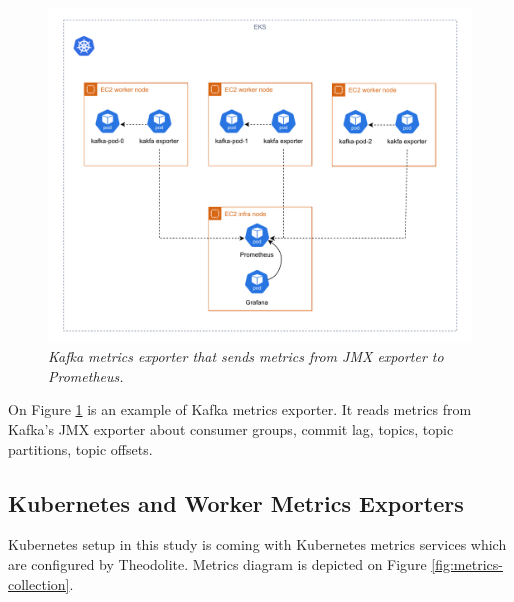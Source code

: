 \begin{figure}[ht]
    \centering
    \includegraphics[width=1\textwidth]{figures/kafka-exporters}
    \caption{\textit{Kafka metrics exporter that sends metrics from JMX exporter to Prometheus.}}
    \label{fig:kafka-exporter}
\end{figure}

On Figure \ref{fig:kafka-exporter} is an example of Kafka metrics exporter.
It reads metrics from Kafka's JMX exporter about consumer groups, commit lag, topics,
topic partitions, topic offsets.

\newpage
\subsection{Kubernetes and Worker Metrics Exporters}
Kubernetes setup in this study is coming with Kubernetes metrics services \cite{kubernetesResourceMetrics} which are
configured by Theodolite.
Metrics diagram is depicted on Figure \ref{fig:metrics-collection}.

